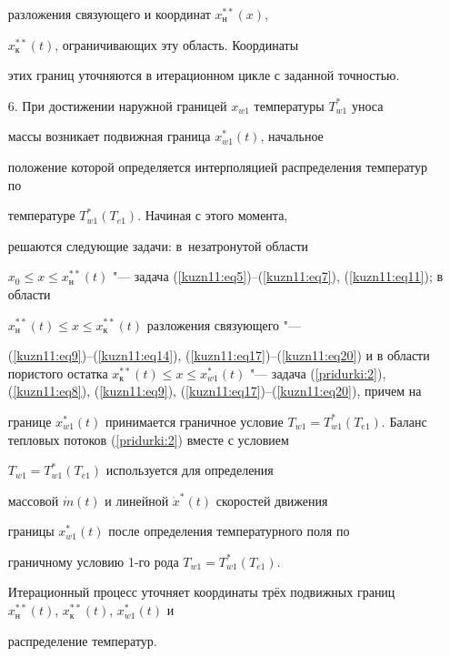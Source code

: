 \begin{itemize}
разложения связующего и координат $x_\text{н}^{\ast \ast } ( x )$,

$x_\text{к}^{\ast \ast} ( t)$, ограничивающих эту область. Координаты

этих границ уточняются в итерационном цикле с заданной точностью.

\item[6.] При достижении наружной границей $x_{w1}$ температуры $T_{w1}^\ast$ уноса

массы возникает подвижная граница $x_{w1}^\ast ( t )$, начальное

положение которой определяется интерполяцией распределения температур по

температуре $T_{w1}^\ast ( T_{e1} )$. Начиная с этого момента,

решаются следующие задачи: в~незатронутой области

$x_0 \le x \le x_\text{н}^{\ast \ast } (t)$ "--- задача (\ref{kuzn11:eq5})--(\ref{kuzn11:eq7}), (\ref{kuzn11:eq11}); в области

$x_\text{н}^{\ast \ast } (t)\le x \le x_\text{к}^{\ast \ast } (t)$ разложения связующего "---

(\ref{kuzn11:eq9})--(\ref{kuzn11:eq14}), (\ref{kuzn11:eq17})--(\ref{kuzn11:eq20}) и в области пористого остатка $x_\text{к}^{\ast \ast } (t)\le

x\le x_{w1}^\ast (t)$ "--- задача (\ref{pridurki:2}), (\ref{kuzn11:eq8}), (\ref{kuzn11:eq9}), (\ref{kuzn11:eq17})--(\ref{kuzn11:eq20}), причем на

границе $x_{w1}^\ast(t)$ принимается граничное условие $T_{w1} =T_{w1}^\ast

\left( T_{e1} \right)$. Баланс тепловых потоков (\ref{pridurki:2}) вместе с условием

$T_{w1} =T_{w1}^\ast (T_{e1})$ используется для определения

массовой $\dot {m}(t)$ и линейной $\dot {x}^\ast (t)$ скоростей движения

границы $x_{w1}^\ast (t)$ после определения температурного поля по

граничному условию 1-го рода $T_{w1} =T_{w1}^\ast ( T_{e1} )$.

Итерационный процесс уточняет координаты трёх подвижных границ $x_\text{н}^{\ast

\ast } (t)$, $x_\text{к}^{\ast \ast } ( t )$, $x_{w1}^\ast (t)$ и

распределение температур.

\end{itemize}








